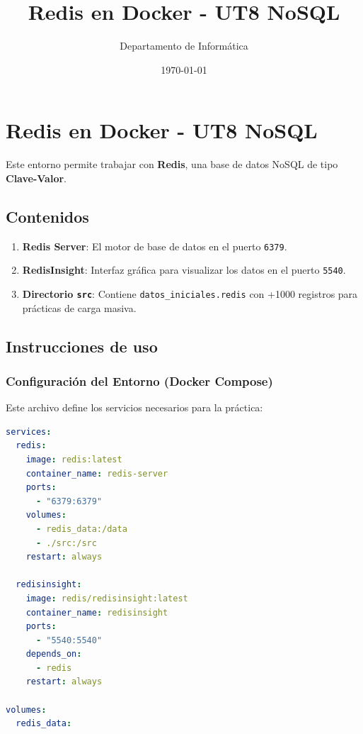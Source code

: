 \documentclass[12pt,a4paper]{article}
\title{\textbf{Redis en Docker - UT8 NoSQL}}
\author{Departamento de Informática}
\date{\today}
\providecommand{\tightlist}{%
  \setlength{\itemsep}{0pt}\setlength{\parskip}{0pt}}
\begin{document}
\maketitle

\hypertarget{redis-en-docker---ut8-nosql}{%
\section{Redis en Docker - UT8
NoSQL}\label{redis-en-docker---ut8-nosql}}

Este entorno permite trabajar con \textbf{Redis}, una base de datos NoSQL de tipo \textbf{Clave-Valor}.

\hypertarget{contenidos}{%
\subsection{Contenidos}\label{contenidos}}

\begin{enumerate}
\def\labelenumi{\arabic{enumi}.}
\tightlist
\item
  \textbf{Redis Server}: El motor de base de datos en el puerto
  \texttt{6379}.
\item
  \textbf{RedisInsight}: Interfaz gráfica para visualizar los datos en
  el puerto \texttt{5540}.
\item
  \textbf{Directorio \texttt{src}}: Contiene
  \texttt{datos\_iniciales.redis} con +1000 registros
  para prácticas de carga masiva.
\end{enumerate}

\hypertarget{instrucciones-de-uso}{%
\subsection{Instrucciones de uso}\label{instrucciones-de-uso}}

\subsubsection{Configuración del Entorno (Docker Compose)}\label{configuracion-del-entorno}

Este archivo define los servicios necesarios para la práctica:

\begin{lstlisting}[language=YAML]
services:
  redis:
    image: redis:latest
    container_name: redis-server
    ports:
      - "6379:6379"
    volumes:
      - redis_data:/data
      - ./src:/src
    restart: always

  redisinsight:
    image: redis/redisinsight:latest
    container_name: redisinsight
    ports:
      - "5540:5540"
    depends_on:
      - redis
    restart: always

volumes:
  redis_data:
\end{lstlisting}
\end{document}
